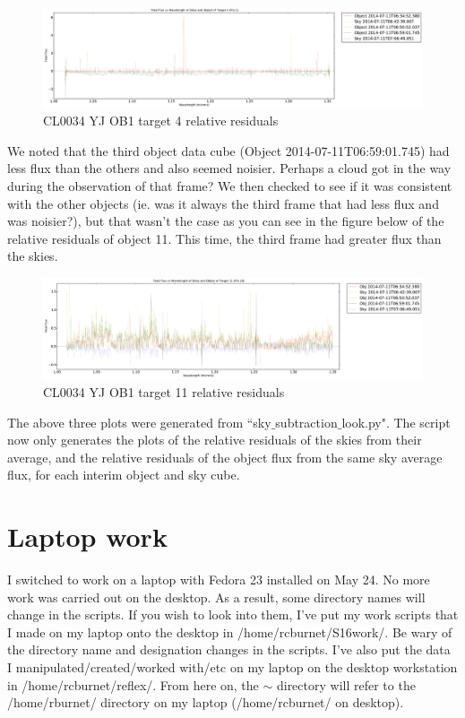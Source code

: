 \documentclass[10pt,letterpaper]{article}
\begin{document}
\begin{figure}[h!]
\caption{CL0034 YJ OB1 target 4 relative residuals}\label{fig:CL0034 YJ OB1 target 4 relative residuals}
\includegraphics[scale=0.4]{figures/sky_flux_raw.pdf}
\end{figure}

We noted that the third object data cube (Object 2014-07-11T06:59:01.745) had less flux than the others and also seemed noisier. Perhaps a cloud got in the way during the observation of that frame? We then checked to see if it was consistent with the other objects (ie. was it always the third frame that had less flux and was noisier?), but that wasn't the case as you can see in the figure below of the relative residuals of object 11. This time, the third frame had greater flux than the skies.\\

\begin{figure}[h!]
\caption{CL0034 YJ OB1 target 11 relative residuals}\label{fig:CL0034 YJ OB1 target 11 relative residuals}
\includegraphics[scale=0.4]{figures/sky_flux.pdf}
\end{figure}

The above three plots were generated from ``sky$\_$subtraction$\_$look.py". The script now only generates the plots of the relative residuals of the skies from their average, and the relative residuals of the object flux from the same sky average flux, for each interim object and sky cube.\\

\section{Laptop work}
I switched to work on a laptop with Fedora 23 installed on May 24. No more work was carried out on the desktop. As a result, some directory names will change in the scripts. If you wish to look into them, I've put my work scripts that I made on my laptop onto the desktop in /home/rcburnet/S16work/. Be wary of the directory name and designation changes in the scripts. I've also put the data I manipulated/created/worked with/etc on my laptop on the desktop workstation in /home/rcburnet/reflex/. From here on, the $\sim$ directory will refer to the /home/rburnet/ directory on my laptop (/home/rcburnet/ on desktop).
\end{document}
